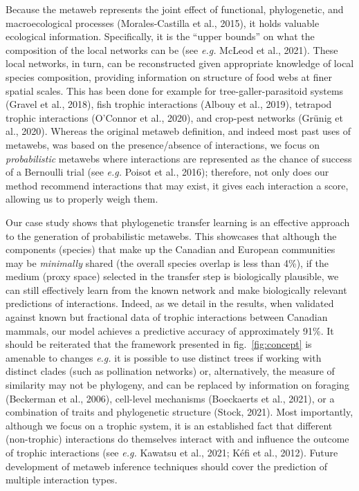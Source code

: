 \documentclass[10pt,oneside]{article}
\begin{document}
Because the metaweb represents the joint effect of functional,
phylogenetic, and macroecological processes (Morales-Castilla et al.,
2015), it holds valuable ecological information. Specifically, it is the
``upper bounds'' on what the composition of the local networks can be
(see \emph{e.g.} McLeod et al., 2021). These local networks, in turn,
can be reconstructed given appropriate knowledge of local species
composition, providing information on structure of food webs at finer
spatial scales. This has been done for example for
tree-galler-parasitoid systems (Gravel et al., 2018), fish trophic
interactions (Albouy et al., 2019), tetrapod trophic interactions
(O'Connor et al., 2020), and crop-pest networks (Grünig et al., 2020).
Whereas the original metaweb definition, and indeed most past uses of
metawebs, was based on the presence/absence of interactions, we focus on
\emph{probabilistic} metawebs where interactions are represented as the
chance of success of a Bernoulli trial (see \emph{e.g.} Poisot et al.,
2016); therefore, not only does our method recommend interactions that
may exist, it gives each interaction a score, allowing us to properly
weigh them.

Our case study shows that phylogenetic transfer learning is an effective
approach to the generation of probabilistic metawebs. This showcases
that although the components (species) that make up the Canadian and
European communities may be \emph{minimally} shared (the overall species
overlap is less than 4\%), if the medium (proxy space) selected in the
transfer step is biologically plausible, we can still effectively learn
from the known network and make biologically relevant predictions of
interactions. Indeed, as we detail in the results, when validated
against known but fractional data of trophic interactions between
Canadian mammals, our model achieves a predictive accuracy of
approximately 91\%. It should be reiterated that the framework presented
in fig.~\ref{fig:concept} is amenable to changes \emph{e.g.} it is
possible to use distinct trees if working with distinct clades (such as
pollination networks) or, alternatively, the measure of similarity may
not be phylogeny, and can be replaced by information on foraging
(Beckerman et al., 2006), cell-level mechanisms (Boeckaerts et al.,
2021), or a combination of traits and phylogenetic structure (Stock,
2021). Most importantly, although we focus on a trophic system, it is an
established fact that different (non-trophic) interactions do themselves
interact with and influence the outcome of trophic interactions (see
\emph{e.g.} Kawatsu et al., 2021; Kéfi et al., 2012). Future development
of metaweb inference techniques should cover the prediction of multiple
interaction types.
\end{document}
